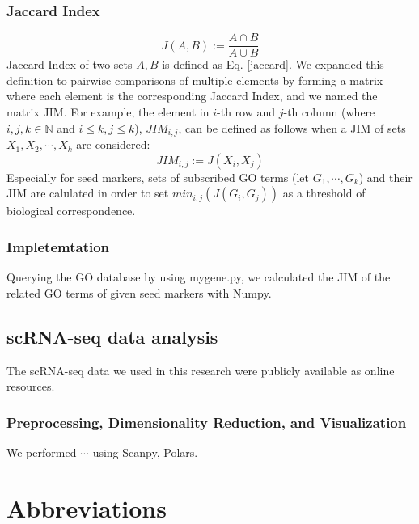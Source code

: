 \documentclass{article}
\begin{document}
\subsubsection*{Jaccard Index}
\begin{equation}\label{jaccard}
  J(A, B) := \frac{A\cap B}{A\cup B}
\end{equation}
Jaccard Index of two sets $A, B$ is defined as Eq. \eqref{jaccard}. We expanded this 
definition to pairwise comparisons of multiple elements by forming a matrix 
where each element is the corresponding Jaccard Index, and we named the matrix \ac{JIM}. For example, the element in 
$i$-th row and $j$-th column (where $i, j, k\in\mathbb{N}$ and $i\leq k, j\leq k$), $JIM_{i,j}$, can be defined as
follows when a JIM of sets $X_1, X_2,\cdots, X_k$ are considered:
\begin{equation}\label{jim}
  JIM_{i, j} := J(X_i, X_j)
\end{equation}
Especially for seed markers, sets of subscribed GO terms (let $G_1, \cdots, G_k$)
and their JIM are calulated in order to set $min_{i,j}(J(G_i, G_j))$ as a threshold of 
biological correspondence.

\subsubsection*{Impletemtation}
Querying the GO database by using mygene.py\cite{mygene}, we calculated the JIM of the
related GO terms of given seed markers with Numpy\cite{numpy}.

\subsection*{scRNA-seq data analysis}
The scRNA-seq data we used in this research were publicly available as online
resources.
\subsubsection*{Preprocessing, Dimensionality Reduction, and Visualization}
We performed $\cdots$ using Scanpy\cite{scanpy}, Polars.

\section*{Abbreviations}
\printacronyms[heading=Abbreviations]



\end{document}
